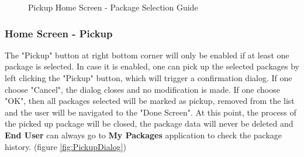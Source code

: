 \begin{figure}[H]
	\hspace{5pt}
	\caption{Pickup Home Screen - Package Selection Guide}
	\label{fig:PickupHomeScreen-2}
\end{figure}


\subsubsection{Home Screen - Pickup}
The "Pickup" button at right bottom corner will only be enabled if at least one package is selected. In case it is enabled, one can pick up the selected packages by left clicking the "Pickup" button, which will trigger a confirmation dialog. If one choose "Cancel", the dialog closes and no modification is made. If one choose "OK", then all packages selected will be marked as pickup, removed from the list and the user will be navigated to the "Done Screen". At this point, the process of the picked up package will be closed, the package data will never be deleted and \textbf{End User} can always go to \textbf{My Packages} application to check the package history. (figure \ref{fig:PickupDialog})

